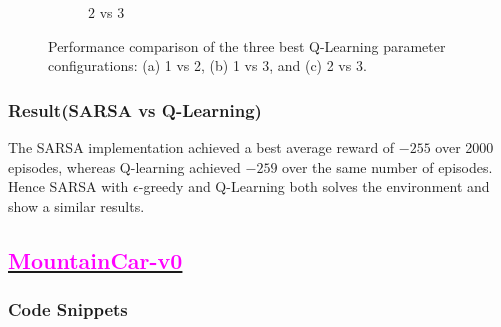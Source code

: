 \documentclass[11pt, a4]{article}
\begin{document}
\begin{figure}[H]
\begin{subfigure}{.7\textwidth}
							\caption{$2$ vs $3$}
							\label{fig:qlearningcartpole2vs3}
						\end{subfigure}
						\caption{Performance comparison of the three best Q-Learning parameter configurations: (a) 1 vs 2, (b) 1 vs 3, and (c) 2 vs 3.}
						\label{fig:qlearningcartpole}
					\end{figure}
				
			\subsubsection{Result(SARSA vs Q-Learning)}
			The SARSA implementation achieved a best average reward of \(-255\) over 2000 episodes, whereas Q-learning achieved \(-259\) over the same number of episodes.  Hence SARSA with $\epsilon$-greedy and Q-Learning both solves the environment and show a similar results.
		\subsection{\href{https://github.com/RitabrataMandal/RL-DA6400-assignment_1/tree/main/mountain_car-v0}{\textcolor{magenta}{MountainCar-v0}}}
			\subsubsection{Code Snippets}
				
				
				
				
				
				
\end{document}
